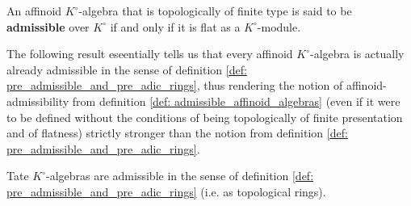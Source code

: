             \begin{definition} \label{def: admissible_affinoid_algebras}
                An affinoid $K^{\circ}$-algebra that is topologically of finite type is said to be \textbf{admissible} over $K^{\circ}$ if and only if it is flat as a $K^{\circ}$-module. 
            \end{definition}
            The following result eseentially tells us that every affinoid $K^{\circ}$-algebra is actually already admissible in the sense of definition \ref{def: pre_admissible_and_pre_adic_rings}, thus rendering the notion of affinoid-admissibility from definition \ref{def: admissible_affinoid_algebras} (even if it were to be defined without the conditions of being topologically of finite presentation and of flatness) strictly stronger than the notion from definition \ref{def: pre_admissible_and_pre_adic_rings}. 
            \begin{proposition} \label{prop: tate_algebras_over_valuation_rings_are_topologically_pre_admissible}
                Tate $K^{\circ}$-algebras are admissible in the sense of definition \ref{def: pre_admissible_and_pre_adic_rings} (i.e. as topological rings).
            \end{proposition}
